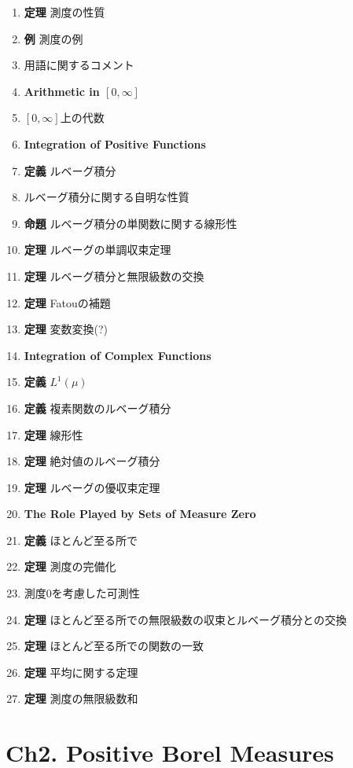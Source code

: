 \documentclass[a4paper,18pt]{jsarticle}
\begin{document}
\begin{enumerate}
  \item \textbf{定理} 測度の性質
  \item \textbf{例} 測度の例
  \item 用語に関するコメント
  \item[] \hspace{-8mm}\textbf{Arithmetic in $[0, \infty]$}
  \item $[0, \infty]$上の代数
  \item[] \hspace{-8mm}\textbf{Integration of Positive Functions}
  \item \textbf{定義} ルベーグ積分
  \item ルベーグ積分に関する自明な性質
  \item \textbf{命題} ルベーグ積分の単関数に関する線形性
  \item \textbf{定理} ルベーグの単調収束定理
  \item \textbf{定理} ルベーグ積分と無限級数の交換
  \item \textbf{定理} Fatouの補題
  \item \textbf{定理} 変数変換(?)
  \item[] \hspace{-8mm}\textbf{Integration of Complex Functions}
  \item \textbf{定義} $L^1(\mu)$
  \item \textbf{定義} 複素関数のルベーグ積分
  \item \textbf{定理} 線形性
  \item \textbf{定理} 絶対値のルベーグ積分
  \item \textbf{定理} ルベーグの優収束定理
  \item[] \hspace{-8mm}\textbf{The Role Played by Sets of Measure Zero}
  \item \textbf{定義} ほとんど至る所で
  \item \textbf{定理} 測度の完備化
  \item 測度0を考慮した可測性
  \item \textbf{定理} ほとんど至る所での無限級数の収束とルベーグ積分との交換
  \item \textbf{定理} ほとんど至る所での関数の一致
  \item \textbf{定理} 平均に関する定理
  \item \textbf{定理} 測度の無限級数和
\end{enumerate}

\section*{Ch2. Positive Borel Measures}
\end{document}

